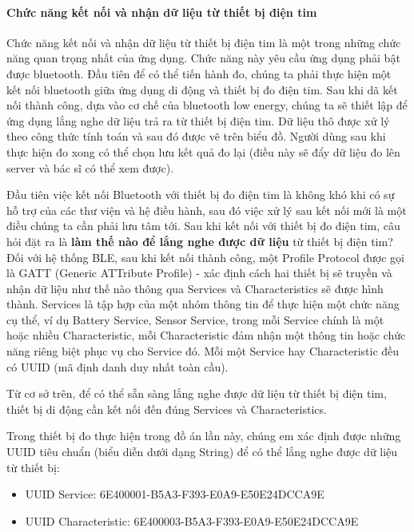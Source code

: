 \paragraph{Chức năng kết nối và nhận dữ liệu từ thiết bị điện tim}
\mbox{}

Chức năng kết nối và nhận dữ liệu từ thiết bị điện tim là một trong những chức năng quan trọng nhất của ứng dụng. Chức năng này yêu cầu
ứng dụng phải bật được bluetooth. Đầu tiên để có thể tiến hành đo, chúng ta phải thực hiện một kết nối bluetooth giữa ứng dụng di động và
thiết bị đo điện tim. Sau khi dã kết nối thành công, dựa vào cơ chế của bluetooth low energy, chúng ta sẽ thiết lập để ứng dụng lắng
nghe dữ liệu trả ra từ thiết bị điện tim. Dữ liệu thô được xử lý theo công thức tính toán và sau đó được vẽ trên biểu đồ. Người dùng sau
khi thực hiện đo xong có thể chọn lưu kết quả đo lại (điều này sẽ đẩy dữ liệu đo lên server và bác sĩ có thể xem được).

Đầu tiên việc kết nối Bluetooth với thiết bị đo điện tim là không khó khi có sự hỗ trợ của các thư viện và hệ điều hành, sau đó việc xử lý sau
kết nối mới là một điều chúng ta cần phải lưu tâm tới. Sau khi kết nối với thiết bị đo điện tim, câu hỏi đặt ra là \textbf{làm thế nào
để lắng nghe được dữ liệu} từ thiết bị điện tim? Đối với hệ thống BLE, sau khi kết nối thành công, một Profile Protocol được gọi
là GATT (Generic ATTribute Profile) - xác định cách hai thiết bị sẽ truyền và nhận dữ liệu như thế nào thông qua
Services và Characteristics sẽ được hình thành. 
Services là tập hợp của một nhóm thông tin để thực hiện một chức năng cụ thể,
ví dụ Battery Service, Sensor Service, trong mỗi Service chính là một hoặc nhiều Characteristic, mỗi Characteristic đảm nhận
một thông tin hoặc chức năng riêng biệt phục vụ cho Service đó. Mỗi một Service hay Characteristic đều có UUID (mã định danh duy nhất toàn cầu).

Từ cơ sở trên, để có thể sẵn sàng lắng nghe được dữ liệu từ thiết bị điện tim, thiết bị di động cần kết nối đến đúng Services và Characteristics.

Trong thiết bị đo thực hiện trong đồ án lần này, chúng em xác định được những UUID tiêu chuẩn (biểu diễn dưới dạng String) để có thể lắng nghe được dữ liệu từ
thiết bị:
\begin{itemize}
  \item UUID Service: 6E400001-B5A3-F393-E0A9-E50E24DCCA9E
  \item UUID Characteristic: 6E400003-B5A3-F393-E0A9-E50E24DCCA9E
\end{itemize}

